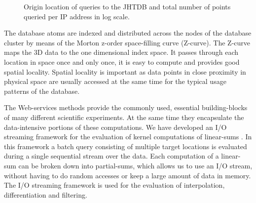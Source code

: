 \documentclass[10pt,twocolumn]{article}
\begin{document}
\begin{figure}
\caption{Origin location of queries to the JHTDB and total number of points queried per IP address in log scale.}
\label{fig:ip_map}
\end{figure}

The database atoms are indexed and distributed across the nodes of the database cluster by means of the Morton z-order space-filling curve (Z-curve). The 
Z-curve maps the 3D data to the one dimensional index space. It passes through each location in space once and only once, it is easy to compute and
provides good spatial locality. Spatial locality is important as data points in close proximity in physical space are usually accessed at the same time for the
typical usage patterns of the database.

The Web-services methods provide the commonly used, essential building-blocks of many different scientific experiments. At the same time they
encapsulate the data-intensive portions of these computations. We have developed an I/O streaming framework for the evaluation of kernel computations of
linear-sums \cite{KanovSC11}. In this framework a batch query consisting of multiple target locations is evaluated during a single sequential stream over 
the data. Each computation of a linear-sum can be broken down into partial-sums, which allows us to use an I/O stream, without having to do random 
accesses or keep a large amount of data in memory. The I/O streaming framework is used for the evaluation of interpolation, differentiation and filtering.
\end{document}
